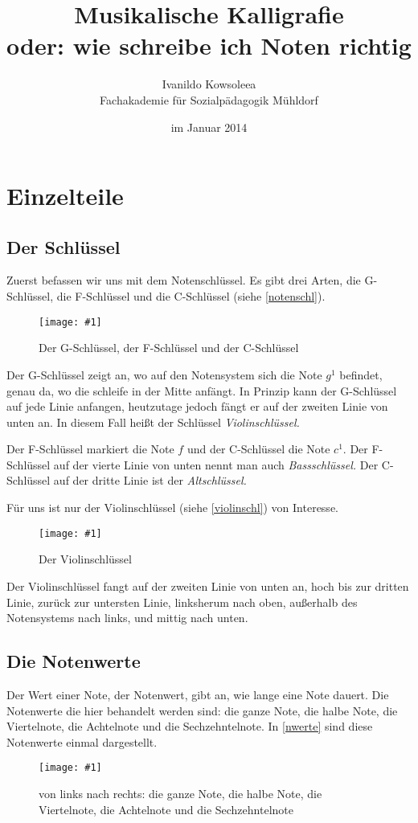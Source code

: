 \documentclass[10pt,a4paper,twoside]{report}
\author{Ivanildo Kowsoleea\\Fachakademie für Sozialpädagogik Mühldorf}
\title{{\huge Musikalische Kalligrafie}\\
{\small oder: wie schreibe ich Noten richtig }}
\date{im Januar 2014}
\newcommand{\comment}[1]{\marginpar{\begin{flushleft}
            \textsf{#1}
        \end{flushleft}}}
\newcommand{\image}[4]{
	\begin{figure}[!ht]
		\centering
		\texttt{[image: \#1]}
		\caption{#2}
		\label{#3}
	\end{figure}
}
\begin{document}
\maketitle
\tableofcontents

\leading{12pt}
\chapter{Einzelteile}

\section{Der Schlüssel}

Zuerst befassen wir uns mit dem Notenschlüssel. Es gibt drei Arten,
die G-Schlüssel, die F-Schlüssel und die C-Schlüssel
(siehe \autoref{notenschl}).
\image{img/schluessel.png}{Der G-Schlüssel, der F-Schlüssel und der C-Schlüssel}{notenschl}{8}

Der G-Schlüssel zeigt an, wo auf den Notensystem sich die Note $g^1$
befindet, genau da, wo die schleife in der Mitte anfängt. 
In Prinzip kann der G-Schlüssel auf jede Linie anfangen, heutzutage
jedoch fängt er auf der zweiten Linie von unten an.
In diesem Fall heißt der Schlüssel \emph{Violinschlüssel.}\comment{Violinschlüssel}

Der F-Schlüssel markiert die Note $f$ und der C-Schlüssel die Note $c^1$. Der F-Schlüssel auf der vierte Linie von unten nennt man auch \emph{Bassschlüssel.} Der C-Schlüssel auf der dritte Linie ist der \emph{Altschlüssel.}

Für uns ist nur der Violinschlüssel (siehe \autoref{violinschl}) von Interesse.
\image{img/violinschl.png}{Der Violinschlüssel}{violinschl}{3}
Der Violinschlüssel fangt auf der zweiten Linie von unten an, hoch bis zur dritten 
Linie, zurück zur untersten Linie, linksherum nach oben, außerhalb des Notensystems nach 
links, und mittig nach unten.

\section{Die Notenwerte}
Der Wert einer Note, der Notenwert, gibt an, wie lange eine Note dauert.
\comment{Notenwert = Dauer}
Die Notenwerte die hier behandelt werden sind: die ganze Note, die halbe Note,
die Viertelnote, die Achtelnote und die Sechzehntelnote. In \autoref{nwerte}
sind diese Notenwerte einmal dargestellt.
\image{img/nwerte.png}{von links nach rechts: die ganze Note, die halbe Note,
die Viertelnote, die Achtelnote und die Sechzehntelnote}{nwerte}{8}
\end{document}

